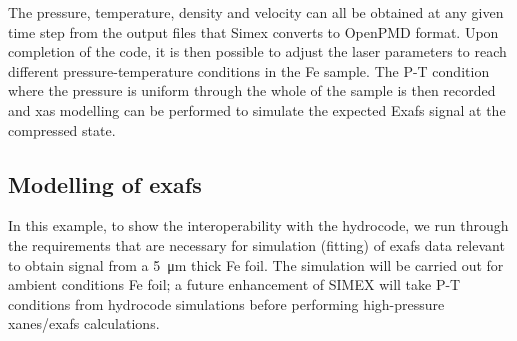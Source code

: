 The pressure, temperature, density and velocity can all be obtained at any given
 time step from the output files that Simex converts to OpenPMD \cite{Huebl2017} format. Upon
 completion of the code, it is then possible to adjust the laser parameters to reach
 different pressure-temperature conditions in the Fe sample. The P-T condition
 where the pressure is uniform through the whole of the sample is then recorded and
 \gls{xas} modelling can be performed to simulate the expected E\gls{xafs} signal at
 the compressed state.
%
 \begin{figure}
 \end{figure}
%
 \subsection{Modelling of \gls{exafs}}
In this example, to show the interoperability with the hydrocode,
we run through the requirements that are necessary for
simulation (fitting) of \gls{exafs} data relevant to obtain signal
from a \SI{5}{\micro\metre} thick Fe foil. The simulation will be carried out for
ambient conditions Fe foil; a future enhancement of SIMEX will take P-T
conditions from hydrocode simulations before performing high-pressure
\gls{xanes}/\gls{exafs} calculations.

